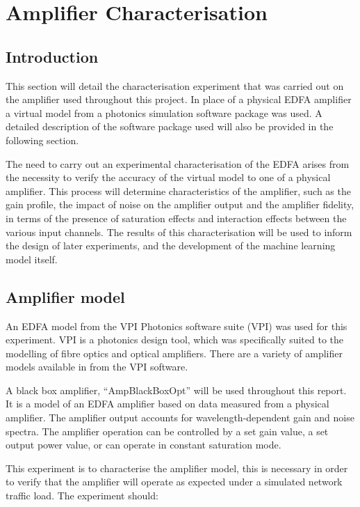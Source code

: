 \newpage
\section{Amplifier Characterisation}
\label{tw:amp_char}


\subsection{Introduction}
This section will detail the characterisation experiment that was carried out on the amplifier used throughout this project. In place of a physical EDFA amplifier a virtual model from a photonics simulation software package was used. A detailed description of the software package used will also be provided in the following section.	

The need to carry out an experimental characterisation of the EDFA arises from the necessity to verify the accuracy of the virtual model to one of a physical amplifier. This process will determine characteristics of the amplifier, such as the gain profile, the impact of noise on the amplifier output and the amplifier fidelity, in terms of the presence of saturation effects and interaction effects between the various input channels. The results of this characterisation will be used to inform the design of later experiments, and the development of the machine learning model itself.

\subsection{Amplifier model}
An EDFA model from the VPI Photonics software suite (VPI) was used for this experiment. VPI is a photonics design tool, which was specifically suited to the modelling of fibre optics and optical amplifiers. There are a variety of amplifier models available in from the VPI software. 

A black box amplifier, “AmpBlackBoxOpt” will be used throughout this report. It is a model of an EDFA amplifier based on data measured from a physical amplifier. The amplifier output accounts for wavelength-dependent gain and noise spectra. The amplifier operation can be controlled by a set gain value, a set output power value, or can operate in constant saturation mode.

This experiment is to characterise the amplifier model, this is necessary in order to verify that the amplifier will operate as expected under a simulated network traffic load.  The experiment should:

